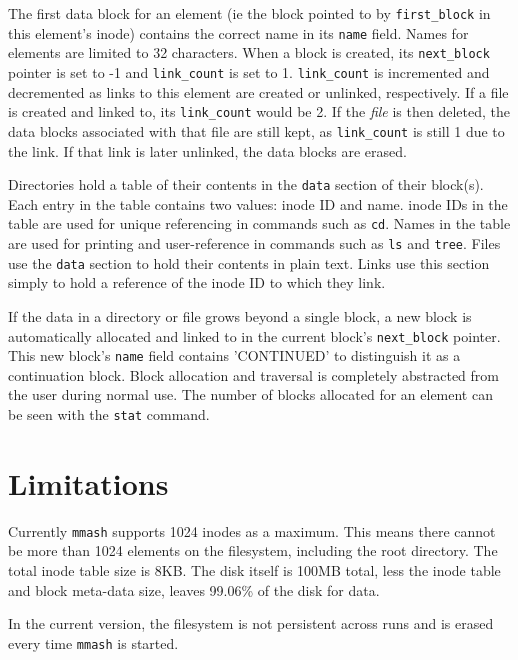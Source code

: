 \documentclass[]{article}
\begin{document}
The first data block for an element (ie the block pointed to by \texttt{first\_block} in this element's inode) contains the correct name in its \texttt{name} field. Names for elements are limited to 32 characters. When a block is created, its \texttt{next\_block} pointer is set to -1 and \texttt{link\_count} is set to 1. \texttt{link\_count} is incremented and decremented as links to this element are created or unlinked, respectively. If a file is created and linked to, its \texttt{link\_count} would be 2. If the \emph{file} is then deleted, the data blocks associated with that file are still kept, as \texttt{link\_count} is still 1 due to the link. If that link is later unlinked, the data blocks are erased.

Directories hold a table of their contents in the \texttt{data} section of their block(s). Each entry in the table contains two values: inode ID and name. inode IDs in the table are used for unique referencing in commands such as \texttt{cd}. Names in the table are used for printing and user-reference in commands such as \texttt{ls} and \texttt{tree}. Files use the \texttt{data} section to hold their contents in plain text. Links use this section simply to hold a reference of the inode ID to which they link.

If the data in a directory or file grows beyond a single block, a new block is automatically allocated and linked to in the current block's \texttt{next\_block} pointer. This new block's \texttt{name} field contains 'CONTINUED' to distinguish it as a continuation block. Block allocation and traversal is completely abstracted from the user during normal use. The number of blocks allocated for an element can be seen with the \texttt{stat} command.

\section{Limitations}

Currently \texttt{mmash} supports 1024 inodes as a maximum. This means there cannot be more than 1024 elements on the filesystem, including the root directory. The total inode table size is 8KB. The disk itself is 100MB total, less the inode table and block meta-data size, leaves 99.06\% of the disk for data. 

In the current version, the filesystem is not persistent across runs and is erased every time \texttt{mmash} is started. 
\end{document}
